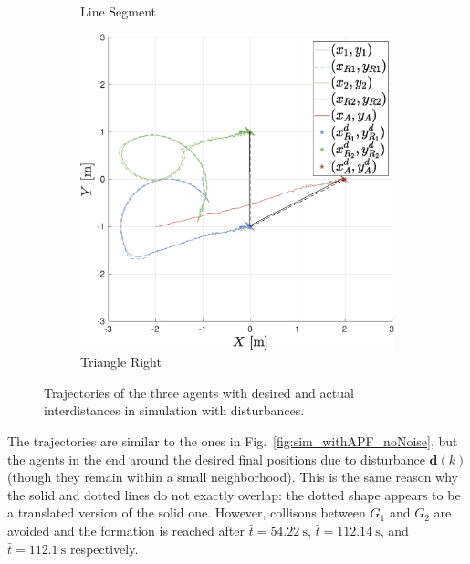 \documentclass{ifacconf}
\begin{document}
\begin{figure}
\begin{subfigure}[b]{0.32\columnwidth}
        \caption{Line Segment}
    \end{subfigure}
    \begin{subfigure}[b]{0.32\columnwidth}
        \centering
        \includegraphics[width=\linewidth]{images/simulations/with_APF/noisy/3rd_scenario_with_noisy.eps}
      \caption{Triangle Right}
    \end{subfigure}
    \vspace{-0.2cm}
    \caption{Trajectories of the three agents with desired and actual interdistances in simulation with disturbances.}
    \label{fig:sim_withAPF_noisy}
\end{figure}
The trajectories are similar to the ones in Fig.~\ref{fig:sim_withAPF_noNoise},
but the agents in the end around the desired final positions due to disturbance $\boldsymbol{d}(k)$
(though they remain within a small neighborhood).
This is the same reason why the solid and dotted lines do not exactly overlap:
the dotted shape appears to be a translated version of the solid one.
However, collisons between $G_1$ and $G_2$ are avoided and the formation is reached after
$\bar{t} = \SI{54.22}{\second}$, $\bar{t} = \SI{112.14}{\second}$, and 
$\bar{t} = \SI{112.1}{\second}$ respectively.
\end{document}
